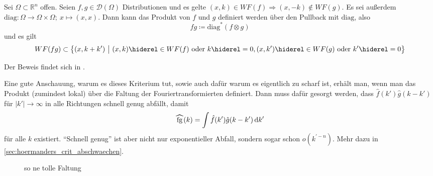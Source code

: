 \begin{theorem}
\label{thm:hoermanders_criterion}
    Sei $\Omega \subset \mathbb{R}^n$ offen.
    Seien $f,g \in \mathcal{D}(\Omega)$ Distributionen und es gelte $(x,k) \in WF(f) \Rightarrow (x,-k) \notin WF(g)$. Es sei außerdem $\mathrm{diag} : \Omega \rightarrow \Omega \times \Omega; ~x \mapsto (x,x)$. Dann kann das Produkt von $f$ und $g$ definiert werden über den Pullback mit $\mathrm{diag}$, also
    \begin{equation*}
        f g \coloneqq \mathrm{diag}^* (f \otimes g)
    \end{equation*}
    und es gilt
    \begin{dmath*}
        WF(fg) \subset \left\{(x,k+k') ~\big|~ (x,k) \hiderel\in WF(f) \textrm{ oder } k \hiderel = 0,\\ (x,k') \hiderel\in WF(g) \textrm{ oder } k'\hiderel=0 \right\}
    \end{dmath*}
\end{theorem}

Der Beweis findet sich in \textcite{Hoermander1985}.

Eine gute Anschauung, warum es dieses Kriterium tut, sowie auch dafür warum es eigentlich zu scharf ist, erhält man, wenn man das Produkt (zumindest lokal) über die Faltung der Fouriertransformierten definiert. Dann muss dafür gesorgt werden, dass $\hat f(k') \hat g(k-k')$ für $|k'| \to \infty$ in alle Richtungen schnell genug abfällt, damit
\begin{equation*}
    \rwhat{fg}(k) = \int \hat f(k') \hat g(k-k') \d k'
\end{equation*}
für alle $k$ existiert. "`Schnell genug"' ist aber nicht nur exponentieller Abfall, sondern sogar schon $o(k^{\prime -n})$. Mehr dazu in \cref{sec:hoermanders_crit_abschwaechen}.


\begin{figure}
\caption{so ne tolle Faltung}
\label{fig:faltung_strahlen}
\end{figure}

